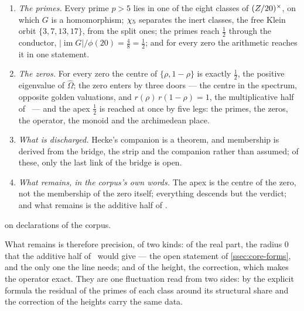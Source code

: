 \begin{proposition}\label{prop:membership-proved}
\begin{enumerate}[label=\textup{(\roman*)}]
  \item \emph{The primes.}  Every prime $p>5$ lies in one of the eight classes of $(Z/20)^\times$,
    on which $G$ is a homomorphism; $\chi_5$ separates the inert classes, the free Klein orbit
    $\{3,7,13,17\}$, from the split ones; the primes reach $\tfrac12$ through the conductor,
    $|\operatorname{im}G|/\phi(20)=\tfrac48=\tfrac12$; and for every zero the arithmetic reaches it in one statement.
  \item \emph{The zeros.}  For every zero the centre of $\{\rho,1-\rho\}$ is exactly $\tfrac12$,
    the positive eigenvalue of $\hat\Omega$; the zero enters by three doors --- the centre in the
    spectrum, opposite golden valuations, and $r(\rho)\,r(1-\rho)=1$, the multiplicative half of \Ecore\ ---
    and the apex $\tfrac12$ is reached at once by five legs: the primes, the zeros, the operator,
    the monoid and the archimedean place.
  \item \emph{What is discharged.}  Hecke's companion is a theorem, and membership is derived from the bridge, the strip and the
    companion rather than assumed; of these, only the last link of the bridge is open.
  \item \emph{What remains, in the corpus's own words.}  The apex is the centre of the zero, not
    the membership of the zero itself; everything descends but the verdict; and what remains is the additive half of \Ecore.
\end{enumerate}


on declarations of the corpus.
\end{proposition}

What remains is therefore precision, of two kinds: of the real part, the radius $0$ that the additive half of \Ecore\ would give --- the open statement of \cref{ssec:core-forms}, and the only one the line
needs; and of the height, the correction, which makes the operator exact.  They are one fluctuation read from
two sides: by the explicit formula the residual of the primes of each class around its
structural share and the correction of the heights carry the same data.

